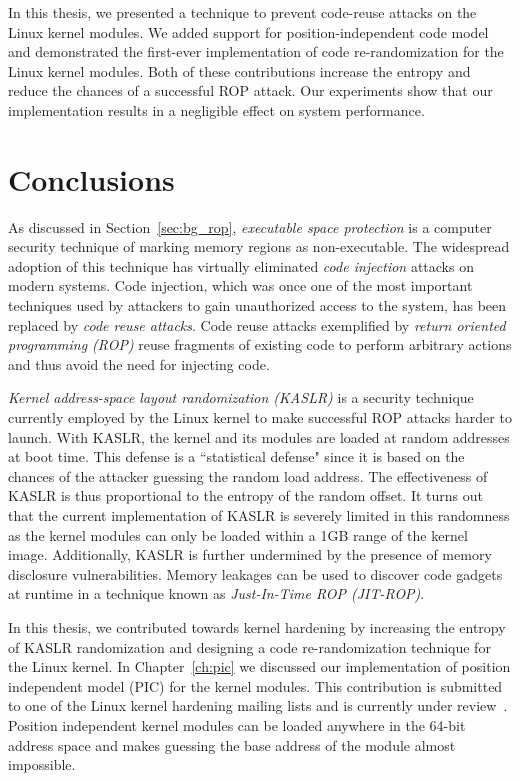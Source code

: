 In this thesis, we presented a technique to prevent code-reuse attacks on the Linux kernel modules. We added support for position-independent code model and demonstrated the first-ever implementation of code re-randomization for the Linux kernel modules. Both of these contributions increase the entropy and reduce the chances of a successful ROP attack. Our experiments show that our implementation results in a negligible effect on system performance.

\section{Conclusions}
As discussed in Section~\ref{sec:bg_rop}, \textit{executable space protection} is a computer security technique of marking memory regions as non-executable. The widespread adoption of this technique has virtually eliminated \textit{code injection} attacks on modern systems. Code injection, which was once one of the most important techniques used by attackers to gain unauthorized access to the system, has been replaced by \textit{code reuse attacks}. Code reuse attacks exemplified by \textit{return oriented programming (ROP)} reuse fragments of existing code to perform arbitrary actions and thus avoid the need for injecting code.

\textit{Kernel address-space layout randomization (KASLR)} is a security technique currently employed by the Linux kernel to make successful ROP attacks harder to launch. With KASLR, the kernel and its modules are loaded at random addresses at boot time. This defense is a ``statistical defense" since it is based on the chances of the attacker guessing the random load address. The effectiveness of KASLR is thus proportional to the entropy of the random offset. It turns out that the current implementation of KASLR is severely limited in this randomness as the kernel modules can only be loaded within a 1GB range of the kernel image. Additionally, KASLR is further undermined by the presence of memory disclosure vulnerabilities. Memory leakages can be used to discover code gadgets at runtime in a technique known as \textit{Just-In-Time ROP (JIT-ROP)}.

In this thesis, we contributed towards kernel hardening by increasing the entropy of KASLR randomization and designing a code re-randomization technique for the Linux kernel. In Chapter~\ref{ch:pic} we discussed our implementation of position independent model (PIC) for the kernel modules. This contribution is submitted to  one of the Linux kernel hardening mailing lists and is currently under review~\cite{pie_patch_1:online,pie_patch_2:online}. Position independent kernel modules can be loaded anywhere in the 64-bit address space and makes guessing the base address of the module almost impossible.

